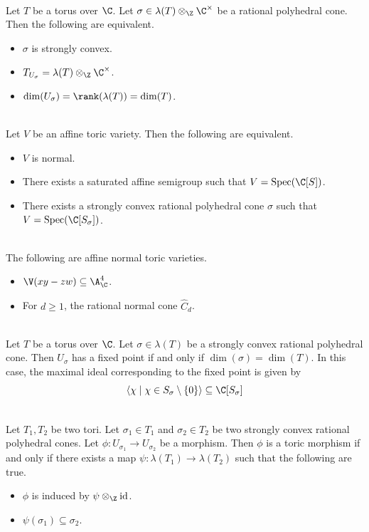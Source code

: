 \documentclass[a4paper]{article}
\begin{document}
\begin{prp}{}{}\\
Let $T$ be a torus over $\C$. Let $\sigma\in\lambda(T)\otimes_\Z\C^\times$ be a rational polyhedral cone. Then the following are equivalent. 
\begin{itemize}
\item $\sigma$ is strongly convex. 
\item $T_{U_\sigma}=\lambda(T)\otimes_\Z\C^\times$. 
\item $\dim(U_\sigma)=\rank(\lambda(T))=\dim(T)$. 
\end{itemize}
\end{prp}

\begin{prp}{}{}\\
Let $V$ be an affine toric variety. Then the following are equivalent. 
\begin{itemize}
\item $V$ is normal. 
\item There exists a saturated affine semigroup such that $V=\text{Spec}(\C[S])$. 
\item There exists a strongly convex rational polyhedral cone $
\sigma$ such that $V=\text{Spec}(\C[S_\sigma])$. 
\end{itemize}
\end{prp}

\begin{eg}{}{}\\
The following are affine normal toric varieties. 
\begin{itemize}
\item $\V(xy-zw)\subseteq\A_\C^4$. 
\item For $d\geq 1$, the rational normal cone $\widehat{C}_d$. 
\end{itemize}
\end{eg}

\begin{prp}{}{}\\
Let $T$ be a torus over $\C$. Let $\sigma\in\lambda(T)$ be a strongly convex rational polyhedral cone. Then $U_\sigma$ has a fixed point if and only if $\dim(\sigma)=\dim(T)$. In this case, the maximal ideal corresponding to the fixed point is given by $$\langle \chi\;|\;\chi\in S_\sigma\setminus\{0\}\rangle\subseteq\C[S_\sigma]$$
\end{prp}

\begin{prp}{}{}\\
Let $T_1,T_2$ be two tori. Let $\sigma_1\in T_1$ and $\sigma_2\in T_2$ be two strongly convex rational polyhedral cones. Let $\phi:U_{\sigma_1}\to U_{\sigma_2}$ be a morphism. Then $\phi$ is a toric morphism if and only if there exists a map $\psi:\lambda(T_1)\to\lambda(T_2)$ such that the following are true. 
\begin{itemize}
\item $\phi$ is induced by $\psi\otimes_\Z\text{id}$. 
\item $\psi(\sigma_1)\subseteq\sigma_2$. 
\end{itemize}
\end{prp}
\end{document}
